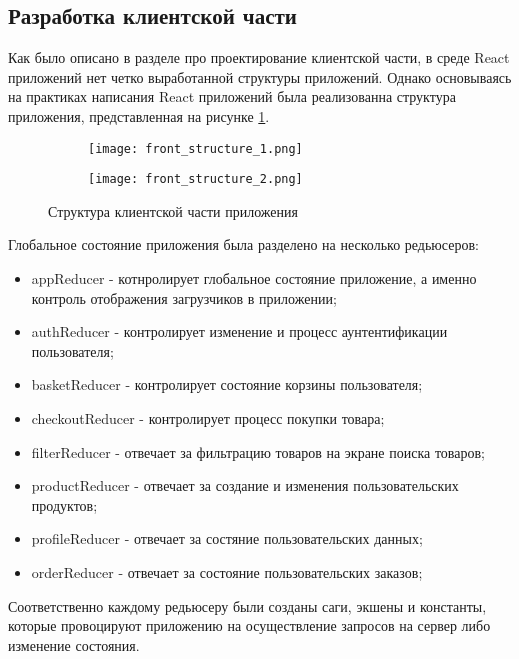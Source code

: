 \subsection{Разработка клиентской части}

Как было описано в разделе про проектирование клиентской части, в среде React приложений нет четко выработанной структуры приложений.
Однако основываясь на практиках написания React приложений была реализованна структура приложения, представленная на рисунке \ref{front:struct}.

\begin{figure}[!ht]
    \begin{subfigure}[b]{0.45\textwidth}
    \centering
    \texttt{[image: front\_structure\_1.png]}
    \caption{}
    \end{subfigure}
    \begin{subfigure}[b]{0.3\textwidth}
    \centering
    \texttt{[image: front\_structure\_2.png]}
    \caption{}
    \end{subfigure}
    \caption{ Структура клиентской части приложения }
    \label{front:struct}
\end{figure}

Глобальное состояние приложения была разделено на несколько редьюсеров:
\begin{itemize}
    \item appReducer - котнролирует глобальное состояние приложение, а именно контроль отображения загрузчиков в приложении;
    \item authReducer - контролирует изменение и процесс аунтентификации пользователя;
    \item basketReducer - контролирует состояние корзины пользователя;
    \item checkoutReducer - контролирует процесс покупки товара;
    \item filterReducer - отвечает за фильтрацию товаров на экране поиска товаров;
    \item productReducer - отвечает за создание и изменения пользовательских продуктов;
    \item profileReducer - отвечает за состяние пользовательских данных;
    \item orderReducer - отвечает за состояние пользовательских заказов;
\end{itemize}

Соответственно каждому редьюсеру были созданы саги, экшены и константы, которые провоцируют приложению на осуществление запросов на сервер либо изменение состояния.

